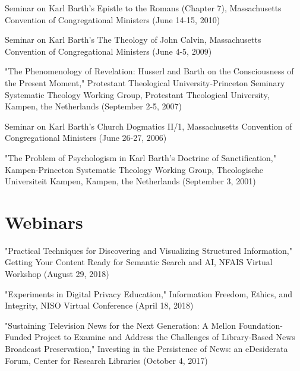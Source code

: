\documentclass[10pt]{res} %
\begin{document}
\begin{resume}
\begin{hangparas}{.25in}{1}Seminar on Karl Barth’s Epistle to the Romans (Chapter 7), Massachusetts Convention of Congregational Ministers (June 14-15, 2010)\end{hangparas}

\begin{hangparas}{.25in}{1}Seminar on Karl Barth’s The Theology of John Calvin, Massachusetts Convention of Congregational Ministers (June 4-5, 2009)\end{hangparas}

\begin{hangparas}{.25in}{1}"The Phenomenology of Revelation: Husserl and Barth on the Consciousness of the Present Moment," Protestant Theological University-Princeton Seminary Systematic Theology Working Group, Protestant Theological University, Kampen, the Netherlands (September 2-5, 2007)\end{hangparas}

\begin{hangparas}{.25in}{1}Seminar on Karl Barth’s Church Dogmatics II/1, Massachusetts Convention of Congregational Ministers (June 26-27, 2006)\end{hangparas}

\begin{hangparas}{.25in}{1}"The Problem of Psychologism in Karl Barth’s Doctrine of Sanctification," Kampen-Princeton Systematic Theology Working Group, Theologische Universiteit Kampen, Kampen, the Netherlands (September 3, 2001)\end{hangparas}

\section{Webinars}

\begin{hangparas}{.25in}{1}"Practical Techniques for Discovering and Visualizing Structured Information," Getting Your Content Ready for Semantic Search and AI, NFAIS Virtual Workshop (August 29, 2018)\end{hangparas}

\begin{hangparas}{.25in}{1}"Experiments in Digital Privacy Education," Information Freedom, Ethics, and Integrity, NISO Virtual Conference (April 18, 2018)\end{hangparas}

\begin{hangparas}{.25in}{1}"Sustaining Television News for the Next Generation: A Mellon Foundation-Funded Project to Examine and Address the Challenges of Library-Based News Broadcast Preservation," Investing in the Persistence of News: an eDesiderata Forum, Center for Research Libraries (October 4, 2017)\end{hangparas}


\end{resume}
\end{document}
